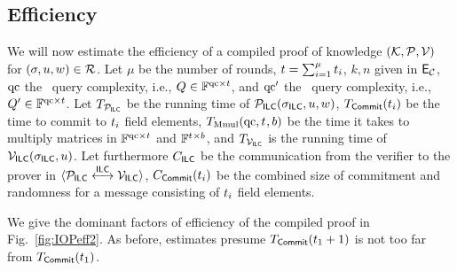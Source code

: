    \subsection{Efficiency}
We will now estimate the efficiency of a compiled proof of knowledge $(\mathcal{K},\mathcal{P},\mathcal{V})$ for $(\mathsf{\sigma},u,w)\in \mathcal{R}$. Let $\mu$ be the number of rounds, $t=\sum_{i=1}^\mu t_i$, $k,n$ given in $\mathsf{E}_{\mathcal{C}}$, $\mathrm{qc}$ the \ILCopen\ query complexity, i.e., $Q \in \mathbb{F}^{\mathrm{qc}\times t}$, and $\mathrm{qc}'$ the \ILCcheck\ query complexity, i.e., $Q' \in \mathbb{F}^{\mathrm{qc}\times t}$. Let $T_{\mathcal{P}_{\mathsf{ILC}}}$ be the running time of $\mathcal{P}_{\mathsf{ILC}}(\mathsf{\sigma}_{\mathsf{ILC}},u,w)$, $T_{\mathsf{Commit}}(t_i)$ be the time to commit to $t_i$ field elements, $T_{\text{Mmul}}(\mathrm{qc},{t_{}},b)$ be the time it takes to multiply matrices in $\mathbb{F}^{\mathrm{qc}\times {t_{}}}$ and $\mathbb{F}^{{t_{}}\times b}$, and $T_{\mathcal{V}_{\mathsf{ILC}}}$ is the running time of $\mathcal{V}_{\mathsf{ILC}}(\mathsf{\sigma}_{\mathsf{ILC}},u)$. Let furthermore $C_{\mathsf{ILC}}$ be the communication from the verifier to the prover in $\langle \mathcal{P}_{\mathsf{ILC}} \overset{\mathsf{ILC}}{\longleftrightarrow} \mathcal{V}_{\mathsf{ILC}}\rangle$, $C_{\mathsf{Commit}}(t_i)$ be the combined size of commitment and randomness for a message consisting of $t_i$ field elements. %

We give the dominant factors of efficiency of the compiled proof in Fig.~\ref{fig:IOPeff2}. As before, estimates presume $T_{\mathsf{Commit}}(t_1+1)$ is not too far from $T_{\mathsf{Commit}}(t_1)$.%


\begin{comment}
We will now determine the complexities of $(\KKIOP,\PoIOP,\VIOP)$ as constructed above, when compiled from an efficient SHVZK proof of knowledge for arithmetic circuit satisfiability relations $\R$ in the \ILC model. The full proof of knowledge is given in section~\ref{sec:ACtoILC} of the supplementary material, and draws inspiration from techniques of~\cite{MatrixZK,Bootle}, who created efficient arguments of knowledge with sublinear communication, in the discrete logarithm setting.
We assume that $\ECC$ is a family of linear-time computable codes with constant rate, so $\sizeeccrand=\bigO(\sizevect)$ linear minimum distance and $\chals=\sep$. See Fig.~\ref{fig:IOPeff} for a table of efficiencies of an arbitrary proof of knowledge $(\KKILC,\PoILC,\VILC)$ using the $\IOP$ channel, and the efficiency of the proof of knowledge for arithmetic circuits from section~\ref{sec:ACtoILC} of the Supplementary Material when compiled to $\IOP$. 
\end{comment}

